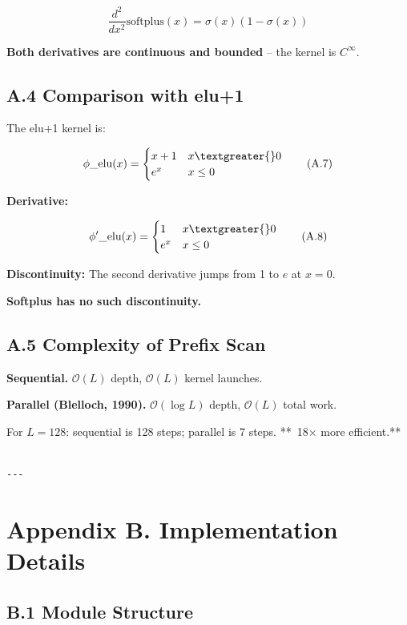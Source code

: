 \[
\frac{d^2}{dx^2}\text{softplus}(x) = \sigma(x)(1 - \sigma(x))
\tag{A.6}
\]

\textbf{Both derivatives are continuous and bounded} -- the kernel is $C^\infty$.

\subsection{A.4 Comparison with elu+1}

The elu+1 kernel is:

\[
\phi\_{\text{elu}}(x) = \begin{cases} x + 1 & x \textgreater{} 0 \\ e^x & x \le 0 \end{cases}
\tag{A.7}
\]

\textbf{Derivative:}

\[
\phi'\_{\text{elu}}(x) = \begin{cases} 1 & x \textgreater{} 0 \\ e^x & x \le 0 \end{cases}
\tag{A.8}
\]

\textbf{Discontinuity:} The second derivative jumps from 1 to $e$ at $x = 0$.

\textbf{Softplus has no such discontinuity.}

\subsection{A.5 Complexity of Prefix Scan}

\textbf{Sequential.} $\mathcal{O}(L)$ depth, $\mathcal{O}(L)$ kernel launches.

\textbf{Parallel (Blelloch, 1990).} $\mathcal{O}(\log L)$ depth, $\mathcal{O}(L)$ 
total work.

For $L = 128$: sequential is 128 steps; parallel is 7 steps. **~18$\times$ more 
efficient.**
\begin{lstlisting}

---
\end{lstlisting}


\section{Appendix B. Implementation Details}

\subsection{B.1 Module Structure}

